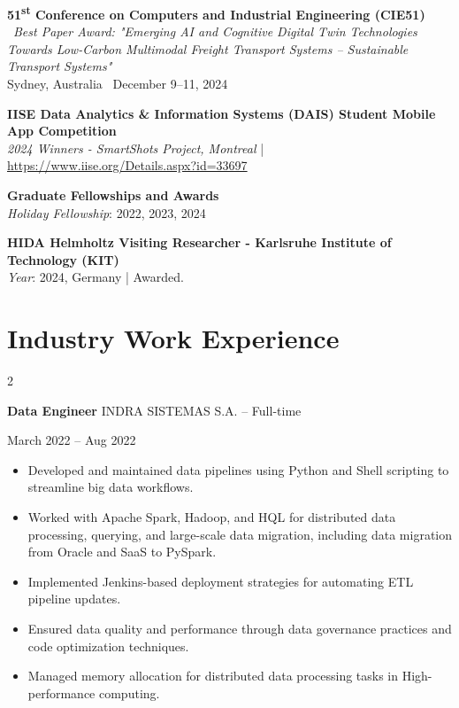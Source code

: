 \documentclass[10pt, letterpaper]{article}
\newenvironment{highlights}{
    \begin{itemize}[
        topsep=0.10 cm,
        parsep=0.10 cm,
        partopsep=0pt,
        itemsep=0pt,
        leftmargin=0 cm + 10pt
    ]
}{
    \end{itemize}
} %
\newenvironment{twocolentry}[2][]{
    \onecolentry
    \def\secondColumn{#2}
    \setcolumnwidth{\fill, 4.5 cm}
    \begin{paracol}{2}
}{
    \switchcolumn \raggedleft \secondColumn
    \end{paracol}
    \endonecolentry
} %
\begin{document}
    \noindent \textbf{51\textsuperscript{st} Conference on Computers and Industrial Engineering (CIE51)} \ \textit{Best Paper Award: "Emerging AI and Cognitive Digital Twin Technologies Towards Low-Carbon Multimodal Freight Transport Systems – Sustainable Transport Systems"} \\ Sydney, Australia \  December 9–11, 2024 \
    \vspace{0.5em}


     
    \noindent \textbf{IISE Data Analytics \& Information Systems (DAIS) Student Mobile App Competition} \\
    \textit{2024 Winners - SmartShots Project, Montreal} | \url{https://www.iise.org/Details.aspx?id=33697}\\
    
    
 
    \vspace{0.5em} %
    
    \noindent \textbf{Graduate Fellowships and Awards} \\
    \textit{Holiday Fellowship}: 2022, 2023, 2024 \\
    
    \vspace{0.5em} %


    
    \noindent \textbf{HIDA Helmholtz Visiting Researcher - Karlsruhe Institute of Technology (KIT)} \\
    \textit{Year}: 2024, Germany | Awarded.




        
\section*{Industry Work Experience}
\small

\begin{twocolentry}{March 2022 – Aug 2022}
    \textbf{Data Engineer}  \textbar INDRA SISTEMAS S.A. – Full-time
\end{twocolentry}
\begin{highlights}
    \item Developed and maintained data pipelines using Python and Shell scripting to streamline big data workflows.
    \item Worked with Apache Spark, Hadoop, and HQL for distributed data processing, querying, and large-scale data migration, including data migration from Oracle and SaaS to PySpark.
    \item Implemented Jenkins-based deployment strategies for automating ETL pipeline updates.
    \item Ensured data quality and performance through data governance practices and code optimization techniques.
    \item Managed memory allocation for distributed data processing tasks in High-performance computing.
\end{highlights}
\vspace{0.3cm}
\end{document}
